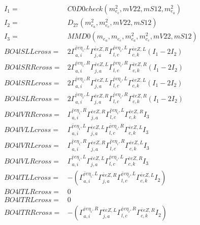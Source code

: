 \documentclass[A4,landscape]{article}
\begin{document}
\begin{align} 
I_1 = & C0D0check(m^2_{e_{{c}}}, mV22, mS12, m^2_{e_{{a}}}) \\ 
I_2 = & D_{27}(m^2_{e_{{a}}}, m^2_{e_{{c}}}, mV22, mS12) \\ 
I_3 = & MMD0(m_{e_{{a}}}, m_{e_{{c}}}, m^2_{e_{{a}}}, m^2_{e_{{c}}}, mV22, mS12) \\ 
  BO4lSLLcross= & 2  \Gamma^{\bar{e}e \eta_i ,L}_{a, i} \Gamma^{\bar{e}e Z ,R}_{j, a} \Gamma^{\bar{e}e \eta_i ,L}_{l, c} \Gamma^{\bar{e}e Z ,L}_{c, k} (I_1 - 2 I_2) \\ 
  BO4lSRRcross= & 2  \Gamma^{\bar{e}e \eta_i ,R}_{a, i} \Gamma^{\bar{e}e Z ,L}_{j, a} \Gamma^{\bar{e}e \eta_i ,R}_{l, c} \Gamma^{\bar{e}e Z ,R}_{c, k} (I_1 - 2 I_2) \\ 
  BO4lSRLcross= & 2  \Gamma^{\bar{e}e \eta_i ,R}_{a, i} \Gamma^{\bar{e}e Z ,L}_{j, a} \Gamma^{\bar{e}e \eta_i ,L}_{l, c} \Gamma^{\bar{e}e Z ,L}_{c, k} (I_1 - 2 I_2) \\ 
  BO4lSLRcross= & 2  \Gamma^{\bar{e}e \eta_i ,L}_{a, i} \Gamma^{\bar{e}e Z ,R}_{j, a} \Gamma^{\bar{e}e \eta_i ,R}_{l, c} \Gamma^{\bar{e}e Z ,R}_{c, k} (I_1 - 2 I_2) \\ 
  BO4lVRRcross= &  \Gamma^{\bar{e}e \eta_i ,R}_{a, i} \Gamma^{\bar{e}e Z ,R}_{j, a} \Gamma^{\bar{e}e \eta_i ,L}_{l, c} \Gamma^{\bar{e}e Z ,R}_{c, k} I_3 \\ 
  BO4lVLLcross= &  \Gamma^{\bar{e}e \eta_i ,L}_{a, i} \Gamma^{\bar{e}e Z ,L}_{j, a} \Gamma^{\bar{e}e \eta_i ,R}_{l, c} \Gamma^{\bar{e}e Z ,L}_{c, k} I_3 \\ 
  BO4lVRLcross= &  \Gamma^{\bar{e}e \eta_i ,R}_{a, i} \Gamma^{\bar{e}e Z ,R}_{j, a} \Gamma^{\bar{e}e \eta_i ,R}_{l, c} \Gamma^{\bar{e}e Z ,L}_{c, k} I_3 \\ 
  BO4lVLRcross= &  \Gamma^{\bar{e}e \eta_i ,L}_{a, i} \Gamma^{\bar{e}e Z ,L}_{j, a} \Gamma^{\bar{e}e \eta_i ,L}_{l, c} \Gamma^{\bar{e}e Z ,R}_{c, k} I_3 \\ 
  BO4lTLLcross= & -( \Gamma^{\bar{e}e \eta_i ,L}_{a, i} \Gamma^{\bar{e}e Z ,R}_{j, a} \Gamma^{\bar{e}e \eta_i ,L}_{l, c} \Gamma^{\bar{e}e Z ,L}_{c, k} I_2) \\ 
  BO4lTLRcross= & 0 \\ 
  BO4lTRLcross= & 0 \\ 
  BO4lTRRcross= & -( \Gamma^{\bar{e}e \eta_i ,R}_{a, i} \Gamma^{\bar{e}e Z ,L}_{j, a} \Gamma^{\bar{e}e \eta_i ,R}_{l, c} \Gamma^{\bar{e}e Z ,R}_{c, k} I_2) \\ 
\end{align} 
\end{document}
